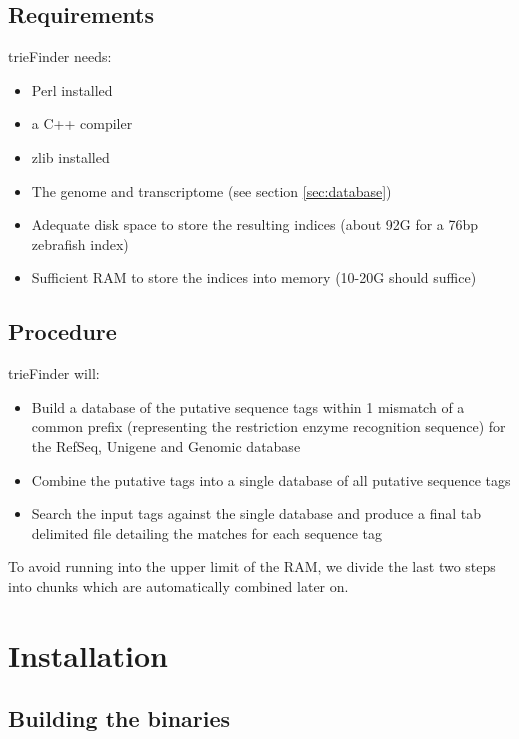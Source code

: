 \documentclass[a4paper,12pt]{article}
\begin{document}
\subsection{Requirements}

trieFinder needs:

\begin{itemize}
\item Perl installed
\item a C++ compiler
\item zlib installed
\item The genome and transcriptome (see section \ref{sec:database})
\item Adequate disk space to store the resulting indices (about 92G for a 76bp zebrafish index)
\item Sufficient RAM to store the indices into memory (10-20G should suffice)
\end{itemize}


\subsection{Procedure}

trieFinder will:

\begin{itemize}
\item Build a database of the putative sequence tags within 1 mismatch of a common prefix (representing the restriction enzyme recognition sequence) for the RefSeq, Unigene and Genomic database 
\item Combine the putative tags into a single database of all putative sequence tags
\item Search the input tags against the single database and produce a final tab delimited file detailing the matches for each sequence tag
\end{itemize}

To avoid running into the upper limit of the RAM, we divide the last two steps into chunks which are automatically combined later on.



\section{Installation}

\subsection{Building the binaries}
\end{document}
